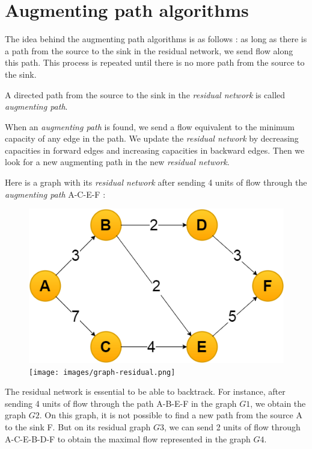 \section{Augmenting path algorithms}
The idea behind the augmenting path algorithms is as follows : 
as long as there is a path from the source to the sink in the residual network, we send flow along this path. This process is repeated until there is no more path from the source to the sink.\newline

A directed path from the source to the sink in the \textit{residual network} is called \textit{augmenting path}. \newline

When an \textit{augmenting path} is found, we send a flow equivalent to the minimum capacity of any edge in the path. We update the \textit{residual network} by decreasing capacities in forward edges and increasing capacities in backward edges. Then we look for a new augmenting path in the new \textit{residual network}. \newline

Here is a graph with its \textit{residual network} after sending 4 units of flow through the \textit{augmenting path} A-C-E-F : \newline

\begin{figure}[!h]
\includegraphics[scale=0.4]{images/graph.png}\hfill
\texttt{[image: images/graph-residual.png]}
\end{figure}
\newpage
The residual network is essential to be able to backtrack. For instance, after sending 4 units of flow through the path A-B-E-F in the graph $G1$, we obtain the graph $G2$. On this graph, it is not possible to find a new path from the source A to the sink F. But on its residual graph $G3$, we can send 2 units of flow through A-C-E-B-D-F to obtain the maximal flow represented in the graph $G4$.\\


